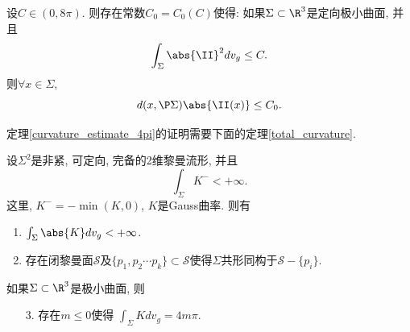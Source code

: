 \begin{theorem} \label{curvature_estimate_4pi}
    设$C \in (0,8\pi)$. 则存在常数$C_0=C_0(C)$使得: 如果$\Sigma \subset \R^3$是定向极小曲面, 并且
    \begin{equation}
        \int_\Sigma \abs{\II}^2 dv_g \le C.
    \end{equation}
    则$\forall x \in \Sigma$,
    \begin{equation}
        d(x,\P \Sigma)\abs{\II(x)} \le C_0.
    \end{equation}
\end{theorem}
定理\eqref{curvature_estimate_4pi}的证明需要下面的定理\eqref{total_curvature}.
\begin{theorem}\label{total_curvature}
    设$\Sigma^2$是非紧, 可定向, 完备的2维黎曼流形, 并且
    \begin{equation}
        \int_\Sigma K^- < +\infty. 
    \end{equation}
    这里, $K^-=-\min(K,0)$, $K$是Gauss曲率. 则有
    \begin{enumerate}
        \item $\int_\Sigma \abs{K} dv_g < +\infty$.
        \item 存在闭黎曼面$\mathcal{S}$及$\{p_1,p_2\cdots p_k\} \subset \mathcal{S}$使得$\Sigma$共形同构于$\mathcal{S}-\{p_i\}$.
    \end{enumerate}
    如果$\Sigma \subset \R^3$是极小曲面, 则
    \begin{enumerate}
        \item[3.] 存在$m \le 0$使得 $\int_\Sigma K dv_g = 4m\pi$.
    \end{enumerate}
\end{theorem}
